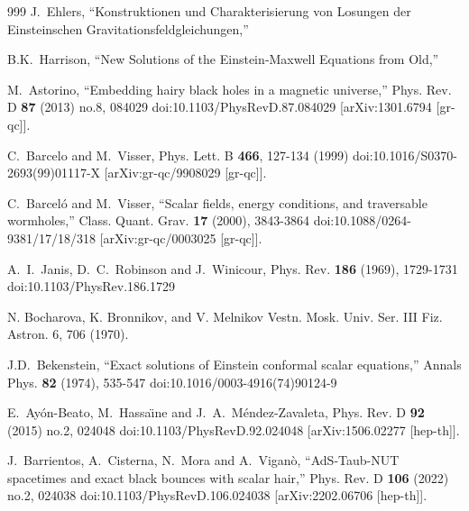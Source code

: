 \documentclass[aps,preprint,groupedaddress,nofootinbib,superscriptaddress,showkeys,showpacs,eqsecnum,amsmath,amssymb]{revtex4-1}
\begin{document}
\begin{thebibliography}{999}
J.~Ehlers,
``Konstruktionen und Charakterisierung von Losungen der Einsteinschen Gravitationsfeldgleichungen,''

B.K.~Harrison,
``New Solutions of the Einstein‐Maxwell Equations from Old,''

M.~Astorino,
``Embedding hairy black holes in a magnetic universe,''
Phys. Rev. D \textbf{87} (2013) no.8, 084029
doi:10.1103/PhysRevD.87.084029
[arXiv:1301.6794 [gr-qc]].

C.~Barcelo and M.~Visser,
Phys. Lett. B \textbf{466}, 127-134 (1999)
doi:10.1016/S0370-2693(99)01117-X
[arXiv:gr-qc/9908029 [gr-qc]].

C.~Barcel\'o and M.~Visser,
``Scalar fields, energy conditions, and traversable wormholes,''
Class. Quant. Grav. \textbf{17} (2000), 3843-3864
doi:10.1088/0264-9381/17/18/318
[arXiv:gr-qc/0003025 [gr-qc]].


A.~I.~Janis, D.~C.~Robinson and J.~Winicour,
Phys. Rev. \textbf{186} (1969), 1729-1731
doi:10.1103/PhysRev.186.1729

N. Bocharova, K. Bronnikov, and V. Melnikov Vestn. Mosk.
Univ. Ser. III Fiz. Astron. 6, 706 (1970).


J.D.~Bekenstein,
``Exact solutions of Einstein conformal scalar equations,''
Annals Phys. \textbf{82} (1974), 535-547
doi:10.1016/0003-4916(74)90124-9


E.~Ay\'on-Beato, M.~Hassa\"\i{}ne and J.~A.~M\'endez-Zavaleta,
Phys. Rev. D \textbf{92} (2015) no.2, 024048
doi:10.1103/PhysRevD.92.024048
[arXiv:1506.02277 [hep-th]].


J.~Barrientos, A.~Cisterna, N.~Mora and A.~Vigan\`o,
``AdS-Taub-NUT spacetimes and exact black bounces with scalar hair,''
Phys. Rev. D \textbf{106} (2022) no.2, 024038
doi:10.1103/PhysRevD.106.024038
[arXiv:2202.06706 [hep-th]].


\end{thebibliography}
\end{document}
